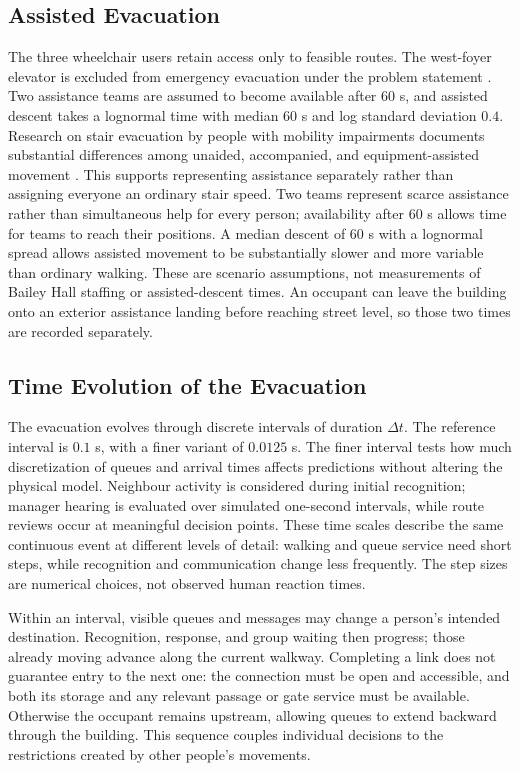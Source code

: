 \documentclass[11pt,a4paper]{article}
\begin{document}



\subsection{Assisted Evacuation}

The three wheelchair users retain access only to feasible routes. The west-foyer elevator is excluded from emergency evacuation under the problem statement \cite{brief}. Two assistance teams are assumed to become available after $60$ s, and assisted descent takes a lognormal time with median $60$ s and log standard deviation $0.4$. Research on stair evacuation by people with mobility impairments documents substantial differences among unaided, accompanied, and equipment-assisted movement \cite{mobility}. This supports representing assistance separately rather than assigning everyone an ordinary stair speed. Two teams represent scarce assistance rather than simultaneous help for every person; availability after $60$ s allows time for teams to reach their positions. A median descent of $60$ s with a lognormal spread allows assisted movement to be substantially slower and more variable than ordinary walking. These are scenario assumptions, not measurements of Bailey Hall staffing or assisted-descent times. An occupant can leave the building onto an exterior assistance landing before reaching street level, so those two times are recorded separately.

\subsection{Time Evolution of the Evacuation}

The evacuation evolves through discrete intervals of duration $\Delta t$. The reference interval is $0.1$ s, with a finer variant of $0.0125$ s. The finer interval tests how much discretization of queues and arrival times affects predictions without altering the physical model. Neighbour activity is considered during initial recognition; manager hearing is evaluated over simulated one-second intervals, while route reviews occur at meaningful decision points. These time scales describe the same continuous event at different levels of detail: walking and queue service need short steps, while recognition and communication change less frequently. The step sizes are numerical choices, not observed human reaction times.

Within an interval, visible queues and messages may change a person's intended destination. Recognition, response, and group waiting then progress; those already moving advance along the current walkway. Completing a link does not guarantee entry to the next one: the connection must be open and accessible, and both its storage and any relevant passage or gate service must be available. Otherwise the occupant remains upstream, allowing queues to extend backward through the building. This sequence couples individual decisions to the restrictions created by other people's movements.
\end{document}

